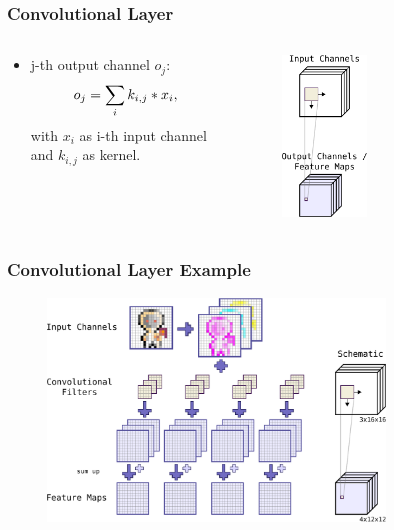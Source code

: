 \begin{frame}
  \frametitle{Convolutional Layer}
  \begin{columns}
    \begin{column}{0.5\textwidth}
      \begin{itemize}
        \item j-th output channel $o_j$:
        \begin{equation*}
          \footnotesize
          o_j = \sum_{i} k_{i, j} \ast x_i,
        \end{equation*}
        \footnotesize
        with $x_i$ as i-th input channel and $k_{i, j}$ as kernel.   
      \end{itemize}
    \end{column}
    \begin{column}{0.5\textwidth}
      \centering
      \begin{figure} \includegraphics[width=0.45\textwidth]{./figs/nn_theory_cnn_scheme.pdf} \end{figure}
      \vfill
    \end{column}
  \end{columns}
\end{frame}

\begin{frame}
  \frametitle{Convolutional Layer Example}
  \begin{figure} \includegraphics[width=0.8\textwidth]{../4_nn/figs/nn_theory_cnn_basics.pdf} \end{figure}
\end{frame}

